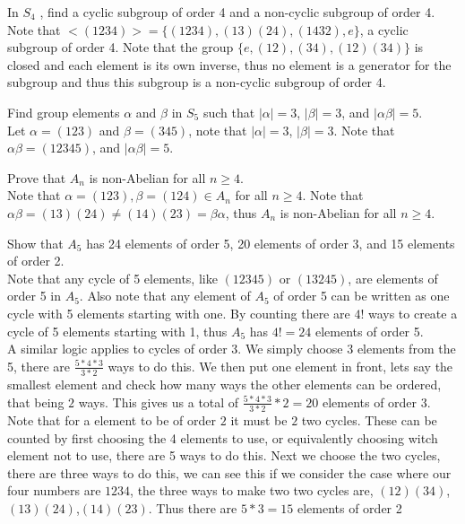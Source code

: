 \documentclass[12pt]{article}
\makeatletter
\theoremstyle{homework}
\newenvironment{exercise}[1]
{\def\@currentlabel{#1}\exercisecore}
{\endexercisecore}
\makeatother
\begin{document}
\begin{exercise}{5.40}
In $S_4$ , find a cyclic subgroup of order 4 and a non-cyclic subgroup of order 4.\\
Note that $<(1234)>=\{(1234),(13)(24),(1432),e\}$, a cyclic subgroup of order 4.  Note that the group $\{e,(12),(34),(12)(34)\}$ is closed and each element is its own inverse, thus no element is a generator for the subgroup and thus this subgroup is a non-cyclic subgroup of order 4.
\end{exercise}

\begin{exercise}{5.43}
Find group elements $\alpha$ and $\beta$ in $S_5$ such that $|\alpha| = 3$, $|\beta| = 3$, and $|\alpha\beta| = 5$.\\
Let $\alpha=(123)$ and $\beta=(345)$, note that $|\alpha| = 3$, $|\beta| = 3$.  Note that $\alpha\beta=(12345)$, and $|\alpha\beta| = 5$.
\end{exercise}

\begin{exercise}{5.46}
Prove that $A_n$ is non-Abelian for all $n \geq 4$.\\
Note that $\alpha=(123),\beta=(124)\in A_n$ for all $n \geq 4$.  Note that $\alpha\beta=(13)(24)\neq (14)(23)=\beta\alpha$, thus $A_n$ is non-Abelian for all $n \geq 4$.
\end{exercise}

\begin{exercise}{5.61}
Show that $A_5$ has 24 elements of order 5, 20 elements of order 3, and 15 elements of order 2.\\
Note that any cycle of 5 elements, like $(12345)$ or $(13245)$, are elements of order 5 in $A_5$.  Also note that any element of $A_5$ of order 5 can be written as one cycle with 5 elements starting with one.  By counting there are $4!$ ways to create a cycle of 5 elements starting with 1, thus $A_5$ has $4!=24$ elements of order 5.\\
A similar logic applies to cycles of order 3.  We simply choose 3 elements from the 5, there are $\frac{5*4*3}{3*2}$ ways to do this.  We then put one element in front, lets say the smallest element and check how many ways the other elements can be ordered, that being $2$ ways.  This gives us a total of $\frac{5*4*3}{3*2}*2=20$ elements of order 3.\\
Note that for a element to be of order $2$ it must be $2$ two cycles.  These can be counted by first choosing the 4 elements to use, or equivalently choosing witch element not to use, there are 5 ways to do this.  Next we choose the two cycles, there are three ways to do this, we can see this if we consider the case where our four numbers are $1234$, the three ways to make two two cycles are, $(12)(34)$,$(13)(24)$,$(14)(23)$.  Thus there are $5*3=15$ elements of order 2
\end{exercise}
\end{document}
